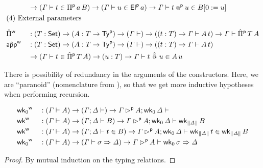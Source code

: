 \begin{definition}
\begin{alignat*}{5}
    & &&
    \ra(\GG \vdash t \in \Piu \, a \, B )
    \ra
    (\GG \vdash u \in \Elu\,a)
    \ra
    \GG \vdash t \appu u \in  B [0 := u] \\
  & \rlap{(4) External parameters} \\[0.5em]
  & \Pimw && :
    (T:\Set)\ra(A : T\ra \Tyu)\ra(\GG \vdash)\ra
    ((t : T)\ra\GG\vdash A\,t) \ra
    \GG \vdash \Pimu \,T\,A
    \\
    & \appmw  && :
    (T:\Set)\ra(A : T\ra \Tyu)\ra(\GG \vdash)\ra
    ((t : T)\ra\GG\vdash A\,t)
    \\
    & &&
    \ra(\GG \vdash t \in \Pimu \,T\,A)
    \ra (u : T) \ra \GG \vdash t\,\appmu\,u \in A\,u
  \end{alignat*}
\end{definition}
There is possibility of redundancy in the arguments of the
constructors. Here, we are ``{paranoid}'' (nomenclature from
\cite{paranoid}), so that we get more inductive hypotheses when
performing recursion.


\begin{lemma}\label{lem:weaken-typing}
\begin{alignat*}{5}
  & {\mathsf{wk}_0}^{\mathsf{w}} && : (\mathit{\Gamma} \vdash A)\rightarrow(\mathit{\Gamma} ; \mathit{\Delta}\vdash) \rightarrow
  \mathit{\Gamma} \mathbin{{\rhd}^{\mathsf{p}}} A ; \mathsf{wk}_0\, \mathit{\Delta} \vdash \\
  & {\mathsf{wk}}^{\mathsf{w}} && : (\mathit{\Gamma} \vdash A)\rightarrow(\mathit{\Gamma} ; \mathit{\Delta}\vdash B) \rightarrow
  \mathit{\Gamma} \mathbin{{\rhd}^{\mathsf{p}}} A ; \mathsf{wk}_0\,\mathit{\Delta} \vdash \mathsf{wk}_{\| \mathit{\Delta} \|}\, B  \\
  & {\mathsf{wk}}^{\mathsf{w}} && : (\mathit{\Gamma} \vdash A)\rightarrow(\mathit{\Gamma} ; \mathit{\Delta}\vdash t\in B) \rightarrow
  \mathit{\Gamma} \mathbin{{\rhd}^{\mathsf{p}}} A ; \mathsf{wk}_0\,\mathit{\Delta} \vdash \mathsf{wk}_{\| \mathit{\Delta} \|}\, t \in \mathsf{wk}_{\| \mathit{\Delta} \|}\,B  \\
  & {\mathsf{wk}_0}^{\mathsf{w}} && : (\mathit{\Gamma} \vdash A)\rightarrow(\mathit{\Gamma} \vdash \sigma
  \Rightarrow \mathit{\Delta}) \rightarrow
  \mathit{\Gamma} \mathbin{{\rhd}^{\mathsf{p}}} A \vdash \mathsf{wk}_0\, \sigma \Rightarrow \mathit{\Delta}
  \end{alignat*}
\end{lemma}
\begin{proof}
By mutual induction on the typing relations.
\end{proof}

